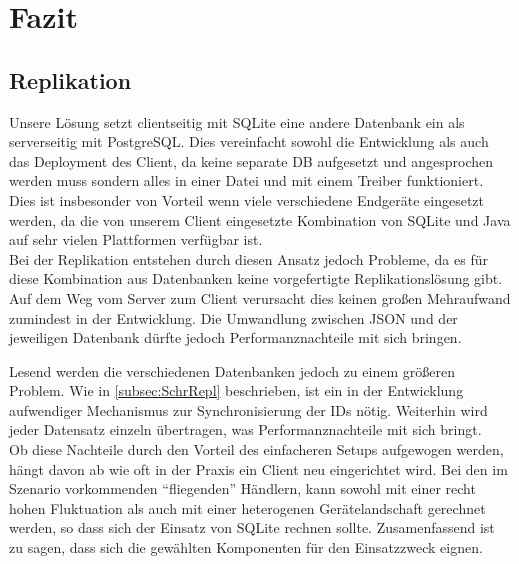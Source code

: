 \documentclass[12pt,a4paper,ngerman,english]{report}
\begin{document}
\chapter{Fazit}

\section{Replikation}
\label{sec:FazitRepl}

Unsere Lösung setzt clientseitig mit SQLite eine andere Datenbank ein als serverseitig mit PostgreSQL. Dies vereinfacht sowohl die Entwicklung als auch das Deployment des Client, da keine separate DB aufgesetzt und angesprochen werden muss sondern alles in einer Datei und mit einem Treiber funktioniert. Dies ist insbesonder von Vorteil wenn viele verschiedene Endgeräte eingesetzt werden, da die von unserem Client eingesetzte Kombination von SQLite und Java auf sehr vielen Plattformen verfügbar ist.\\

Bei der Replikation entstehen durch diesen Ansatz jedoch Probleme, da es für diese Kombination aus Datenbanken keine vorgefertigte Replikationslösung gibt. Auf dem Weg vom Server zum Client verursacht dies keinen großen Mehraufwand zumindest in der Entwicklung. Die Umwandlung zwischen JSON und der jeweiligen Datenbank dürfte jedoch Performanznachteile mit sich bringen.

Lesend werden die verschiedenen Datenbanken jedoch zu einem größeren Problem. Wie in \autoref{subsec:SchrRepl} beschrieben, ist ein in der Entwicklung aufwendiger Mechanismus zur Synchronisierung der IDs nötig. Weiterhin wird jeder Datensatz einzeln übertragen, was Performanznachteile mit sich bringt.\\

Ob diese Nachteile durch den Vorteil des einfacheren Setups aufgewogen werden, hängt davon ab wie oft in der Praxis ein Client neu eingerichtet wird. Bei den im Szenario vorkommenden ``fliegenden'' Händlern, kann sowohl mit einer recht hohen Fluktuation als auch mit einer heterogenen Gerätelandschaft gerechnet werden, so dass sich der Einsatz von SQLite rechnen sollte. Zusamenfassend ist zu sagen, dass sich die gewählten Komponenten für den Einsatzzweck eignen.

{}

\end{document}
